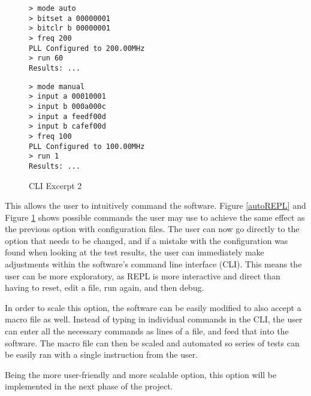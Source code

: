 \begin{figure}[H]
  \centering
  \begin{minipage}[b]{.5\linewidth}
  \begin{verbatim}
> mode auto
> bitset a 00000001
> bitclr b 00000001
> freq 200
PLL Configured to 200.00MHz
> run 60
Results: ...
  \end{verbatim}
  \caption{CLI Excerpt 1}
  \label{autoREPL}
  \end{minipage}%
  \begin{minipage}[b]{.5\linewidth}
  \begin{verbatim}
> mode manual
> input a 00010001
> input b 000a000c
> input a feedf00d
> input b cafef00d
> freq 100
PLL Configured to 100.00MHz
> run 1
Results: ...
  \end{verbatim}
  \caption{CLI Excerpt 2}
  \label{manREPL}
  \end{minipage}
\end{figure}

This allows the user to intuitively command the software.
Figure \ref{autoREPL} and Figure \ref{manREPL} shows possible commands the user may use to achieve the same effect as the previous option with configuration files.
The user can now go directly to the option that needs to be changed, and if a mistake with the configuration was found when looking at the test results, the user can immediately make adjustments within the software's command line interface (CLI).
This means the user can be more exploratory, as REPL is more interactive and direct than having to reset, edit a file, run again, and then debug.

In order to scale this option, the software can be easily modified to also accept a macro file as well.
Instead of typing in individual commands in the CLI, the user can enter all the necessary commands as lines of a file, and feed that into the software.
The macro file can then be scaled and automated so series of tests can be easily ran with a single instruction from the user.

Being the more user-friendly and more scalable option, this option will be implemented in the next phase of the project.
